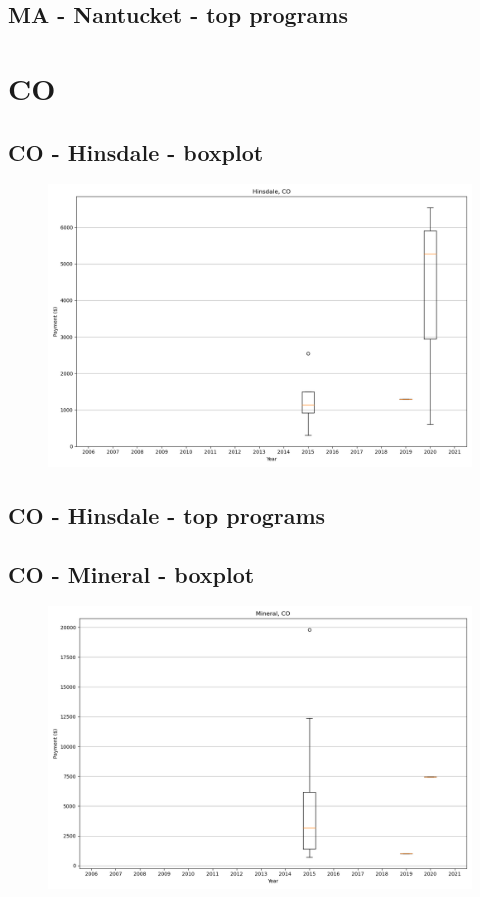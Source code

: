 \subsection*{MA - Nantucket - top programs}

\newpage
\section*{CO}
\subsection*{CO - Hinsdale - boxplot}
\begin{figure}[h]
\centering
\includegraphics[width=7in]{../output/boxplots/counties/Hinsdale-CO_boxplot.png}
\end{figure}


\subsection*{CO - Hinsdale - top programs}

\newpage
\subsection*{CO - Mineral - boxplot}
\begin{figure}[h]
\centering
\includegraphics[width=7in]{../output/boxplots/counties/Mineral-CO_boxplot.png}
\end{figure}


